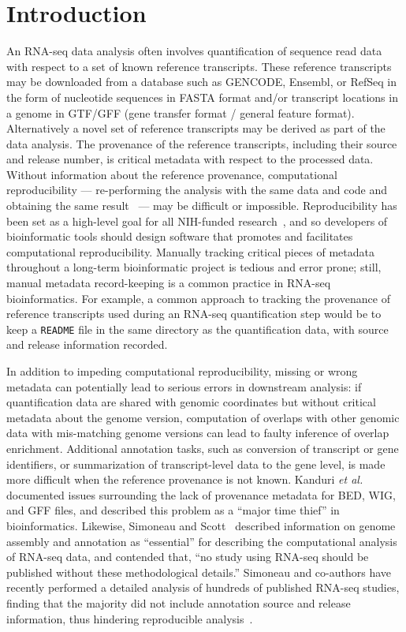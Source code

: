 \documentclass[10pt,letterpaper]{article}
\begin{document}
\section*{Introduction}

An RNA-seq data analysis often involves quantification of sequence
read data with respect to a set of known reference transcripts. These
reference transcripts may be downloaded from a database such as
GENCODE, Ensembl, or RefSeq \cite{gencode,ensembl,refseq} in the form
of nucleotide sequences in FASTA format and/or transcript locations in a genome in
GTF/GFF (gene transfer format / general feature format). Alternatively
a novel set of reference transcripts may be derived as part of the data analysis. The
provenance of the reference transcripts, including their source and release
number, is critical metadata with respect to the processed data. Without
information about the reference provenance, computational
reproducibility --- re-performing the analysis with the same data and
code and obtaining the same result~\cite{Patil2016} --- 
may be difficult or impossible. Reproducibility has been set as a
high-level goal for all NIH-funded research~\cite{collins2014,lauer2017}, 
and so developers of bioinformatic tools should design software
that promotes and facilitates computational reproducibility.
Manually tracking
critical pieces of metadata throughout a long-term bioinformatic
project is tedious and error prone; still, manual metadata record-keeping is
a common practice in RNA-seq bioinformatics. For example, a common
approach to tracking the provenance of reference transcripts used during
an RNA-seq quantification step would be to keep a \texttt{README} file
in the same directory as the quantification data, with source and
release information recorded.

In addition to impeding computational reproducibility, missing or
wrong metadata can potentially lead to serious errors in downstream
analysis: if quantification data are shared with genomic coordinates
but without critical metadata about the genome version, computation of
overlaps with other genomic data with mis-matching genome versions can
lead to faulty inference of overlap enrichment. Additional annotation
tasks, such as conversion of transcript or gene identifiers, or
summarization of transcript-level data to the gene level, is made more difficult
when the reference provenance is not known. Kanduri \textit{et al.}~\cite{Kanduri2017}
documented issues surrounding the lack of provenance metadata for BED,
WIG, and GFF files, and described this problem as a ``major time
thief'' in bioinformatics. Likewise, Simoneau and
Scott~\cite{Simoneau2019} described 
information on genome assembly and annotation as ``essential'' for
describing the computational analysis of RNA-seq data, and contended
that, ``no study using RNA-seq should be published without these
methodological details.'' Simoneau and co-authors have recently
performed a detailed analysis of hundreds of published RNA-seq studies,
finding that the majority did not include annotation source and release
information, thus hindering reproducible analysis~\cite{Simoneau2019BIB}.
\end{document}

